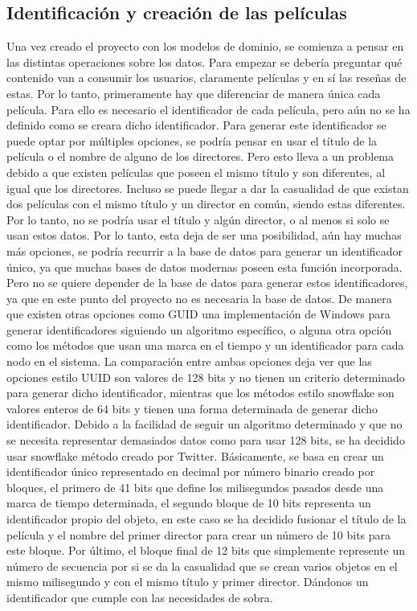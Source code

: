 \subsection{Identificación y creación de las películas}

Una vez creado el proyecto con los modelos de dominio, se comienza a pensar en las 
distintas operaciones sobre los datos. Para empezar se debería preguntar qué contenido van a 
consumir los usuarios, claramente películas y en sí las reseñas de estas. Por lo tanto, primeramente 
hay que diferenciar de manera única cada película. Para ello es necesario el identificador de cada 
película, pero aún no se ha definido como se creara dicho identificador. Para generar este 
identificador se puede optar por múltiples opciones, se podría pensar en usar el título de la película 
o el nombre de alguno de los directores. Pero esto lleva a un problema debido a 
que existen películas que poseen el mismo título y son diferentes, al igual que los directores. 
Incluso se puede llegar a dar la casualidad de que existan dos películas con el mismo título y 
un director en común, siendo estas diferentes. Por lo tanto, no se podría usar el título y algún 
director, o al menos si solo se usan estos datos. Por lo tanto, esta deja de ser una posibilidad, aún 
hay muchas más opciones, se podría recurrir a la base de datos para generar un identificador 
único, ya que muchas bases de datos modernas poseen esta función incorporada. Pero no se quiere 
depender de la base de datos para generar estos identificadores, ya que en este punto del proyecto no 
es necesaria la base de datos. De manera que existen otras opciones como GUID una implementación de 
Windows para generar identificadores siguiendo un algoritmo específico, o alguna otra opción como los 
métodos que usan una marca en el tiempo y un identificador para cada nodo en el sistema. La comparación 
entre ambas opciones \cite{compSnowUUID} deja ver que las opciones estilo UUID son valores de 128 bits 
y no tienen un criterio determinado para generar dicho identificador, mientras que los métodos estilo 
snowflake son valores enteros de 64 bits y tienen una forma determinada de generar dicho identificador. 
Debido a la facilidad de seguir un algoritmo determinado y que no se necesita representar demasiados 
datos como para usar 128 bits, se ha decidido usar snowflake \cite{snowF} método creado por Twitter. 
Básicamente, se basa en crear un identificador único representado en decimal por número binario creado 
por bloques, el primero de 41 bits que define los milisegundos pasados desde una marca de tiempo 
determinada, el segundo bloque de 10 bits representa un identificador propio del objeto, en este caso 
se ha decidido fusionar el título de la película y el nombre del primer director para crear un número 
de 10 bits para este bloque. Por último, el bloque final de 12 bits que simplemente represente un 
número de secuencia por si se da la casualidad que se crean varios objetos en el mismo milisegundo y 
con el mismo título y primer director. Dándonos un identificador que cumple con las necesidades de 
sobra.

